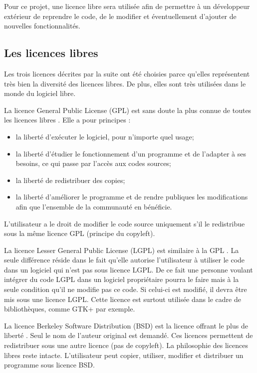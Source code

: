	Pour ce projet, une licence libre sera utilisée afin de permettre à un développeur extérieur de reprendre le code, de le modifier et éventuellement d'ajouter de nouvelles fonctionnalités.     


	\subsection{Les licences libres}
		Les trois licences décrites par la suite ont été choisies parce qu’elles représentent très bien la diversité des licences libres. De plus, elles sont très utilisées dans le monde du logiciel libre.

		La licence General Public License (GPL) est sans doute la plus connue de toutes les licences libres \cite{website:licenceGPL}. Elle a pour principes :
		\begin{itemize}
			\item la liberté d'exécuter le logiciel, pour n'importe quel usage; 
			\item la liberté d'étudier le fonctionnement d'un programme et de l'adapter à ses besoins, ce qui passe par l'accès aux codes sources;
			\item la liberté de redistribuer des copies;
			\item la liberté d'améliorer le programme et de rendre publiques les modifications afin que l'ensemble de la communauté en bénéficie.
		\end{itemize}

	L’utilisateur a le droit de modifier le code source uniquement s’il le redistribue sous la même licence GPL (principe du copyleft).

		La licence Lesser General Public License (LGPL) est similaire à la GPL \cite{website:licenceLGPL}. La seule différence réside dans le fait qu’elle autorise l’utilisateur à utiliser le code dans un logiciel qui n’est pas sous licence LGPL. De ce fait une personne voulant intégrer du code LGPL dans un logiciel propriétaire pourra le faire mais à la seule condition qu’il ne modifie pas ce code. Si celui-ci est modifié, il devra être mis sous une licence LGPL. Cette licence est surtout utilisée dans le cadre de bibliothèques, comme GTK+ par exemple.

		La licence Berkeley Software Distribution (BSD) est la licence offrant le plus de liberté \cite{website:licenceBSD}. Seul le nom de l’auteur original est demandé. Ces licences permettent de redistribuer sous une autre licence (pas de copyleft). La philosophie des licences libres reste intacte. L’utilisateur peut copier, utiliser, modifier et distribuer un programme sous licence BSD.


